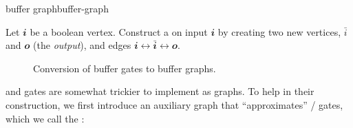 \begin{definition}{buffer graph}{buffer-graph}

  Let \(𝒊\) be a boolean vertex.  Construct a  on input \(𝒊\)
  by creating two new vertices, \(\bar i\) and \(𝒐\) (the \emph{output}), and
  edges \(𝒊↔\bar 𝒊↔𝒐\).

  \begin{figure}[H]
  \begin{center}
    \caption{Conversion of buffer gates to buffer graphs.}
  \end{center}
\end{figure}

\end{definition}

\AND{} and \OR{} gates are somewhat trickier to implement as graphs. To help in
their construction, we first introduce an auxiliary graph that ``approximates''
\AND/\OR{} gates, which we call the :

